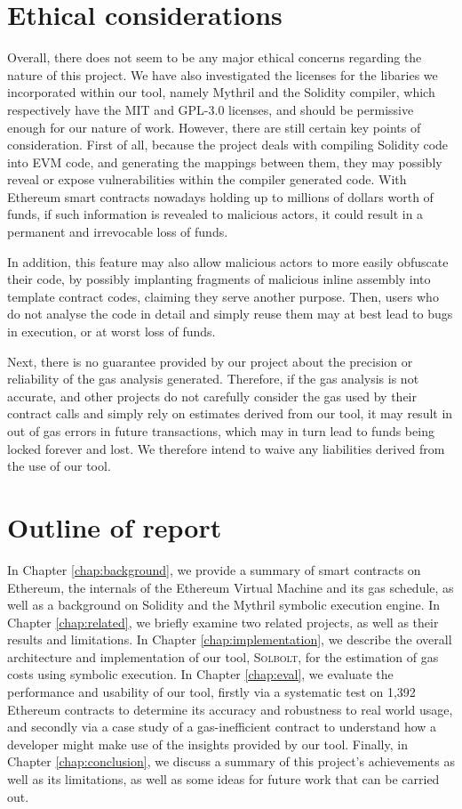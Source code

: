 \section{Ethical considerations}

Overall, there does not seem to be any major ethical concerns regarding the nature of 
this project. We have also investigated the licenses for the libaries we incorporated
within our tool, namely Mythril and the Solidity compiler, which respectively have the MIT and GPL-3.0
licenses, and should be permissive enough for our nature of work. 
However, there are still certain key points of consideration. First of all,
because the project deals with compiling Solidity code into 
EVM code, and generating the mappings between them, they may possibly reveal or
expose vulnerabilities within the compiler generated code. With Ethereum smart contracts 
nowadays holding up to millions of dollars worth of funds, if such information is revealed
to malicious actors, it could result in a permanent and irrevocable loss of funds.

In addition, this feature may also allow malicious actors to more easily obfuscate their code,
by possibly implanting fragments of malicious inline assembly into template contract codes,
claiming they serve another purpose. Then, users who do not analyse the code in detail and
simply reuse them may at best lead to bugs in execution, or at worst loss of funds.

Next, there is no guarantee provided by our project about the precision or reliability
of the gas analysis generated. Therefore, if the gas analysis is not accurate, and other projects
do not carefully consider the gas used by their contract calls and simply rely on estimates derived
from our tool, it may result in out of gas errors in future transactions, which may in turn
lead to funds being locked forever and lost. We therefore intend to waive any liabilities derived
from the use of our tool.


\section{Outline of report}

In Chapter \ref{chap:background}, we provide a summary of smart contracts on Ethereum, the internals of the
Ethereum Virtual Machine and its gas schedule, as well as a background on Solidity and the 
Mythril symbolic execution engine. 
In Chapter \ref{chap:related}, we briefly examine two 
related projects, as well as their results and limitations.
In Chapter \ref{chap:implementation}, we describe the
overall architecture and implementation of our tool, \textcolor{NavyBlue}{\textsc{Solbolt}}, for the estimation of gas 
costs using symbolic execution. 
In Chapter \ref{chap:eval}, we 
evaluate the performance and usability of our tool, firstly via a systematic test on 1,392 Ethereum contracts
to determine its accuracy and robustness to real world usage, and secondly via a case study of a gas-inefficient 
contract to understand how a developer might make use of the insights provided by our tool. 
Finally, in Chapter \ref{chap:conclusion}, we discuss a summary of this project's achievements as 
well as its limitations, as well as some ideas for future work that can be carried out.